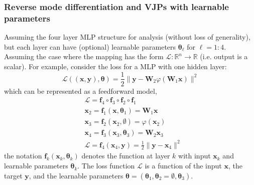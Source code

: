 \documentclass[11pt]{article}
\begin{document}
\subsubsection{Reverse mode differentiation and VJPs with learnable parameters}
Assuming the four layer MLP structure for analysis (without loss of generality), but each layer can have (optional) learnable parameters $\boldsymbol{\theta}_\ell$ for $\ell = 1:4$.
Assuming the case where the mapping has the form $\mathcal{L}: \mathbb{R}^n \to \mathbb{R}$ (i.e. output is a scalar). For example, consider the loss for a MLP with one hidden layer:
\[
\mathcal{L}((\boldsymbol{x},\boldsymbol{y}), \boldsymbol{\theta}) = \frac{1}{2} \|\boldsymbol{y} - \mathbf{W}_2 \varphi(\mathbf{W}_1 \boldsymbol{x}) \|^2
\]
which can be represented as a feedforward model,
\[
\begin{aligned}
&\mathcal{L} = \boldsymbol{f}_4 \circ \boldsymbol{f}_3 \circ \boldsymbol{f}_2 \circ \boldsymbol{f}_1 \\
&\boldsymbol{x}_2 = \boldsymbol{f}_1(\boldsymbol{x}, \boldsymbol{\theta}_1) = \mathbf{W}_1 \boldsymbol{x} \\
&\boldsymbol{x}_3 = \boldsymbol{f}_2(\boldsymbol{x}_2, \emptyset) = \varphi(\boldsymbol{x}_2) \\
&\boldsymbol{x}_4 = \boldsymbol{f}_3(\boldsymbol{x}_3, \boldsymbol{\theta}_3) = \mathbf{W}_2 \boldsymbol{x}_3 \\
&\mathcal{L} = \boldsymbol{f}_4(\boldsymbol{x}_4, \boldsymbol{y}) = \frac{1}{2} \|\boldsymbol{y} - \boldsymbol{x}_4\|^2
\end{aligned}
\]
the notation $\boldsymbol{f}_k(\boldsymbol{x}_k, \boldsymbol{\theta}_k)$ denotes the function at layer $k$ with input $\boldsymbol{x}_k$ and learnable parameters $\boldsymbol{\theta}_k$. 
The loss function $\mathcal{L}$ is a function of the input $\boldsymbol{x}$, the target $\boldsymbol{y}$, and the learnable parameters $\boldsymbol{\theta} = (\boldsymbol{\theta}_1, \boldsymbol{\theta}_2 = \emptyset, \boldsymbol{\theta}_3)$.
\end{document}
